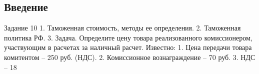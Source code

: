 \subsection*{Введение}
Задание 10
1. Таможенная стоимость, методы ее определения.
2. Таможенная политика РФ.
3. Задача. Определите цену товара реализованного комиссионером,
участвующим в расчетах за наличный расчет.
Известно:
1. Цена передачи товара комитентом – 250 руб. (НДС).
2. Комиссионное вознаграждение – 70 руб.
3. НДС – 18%